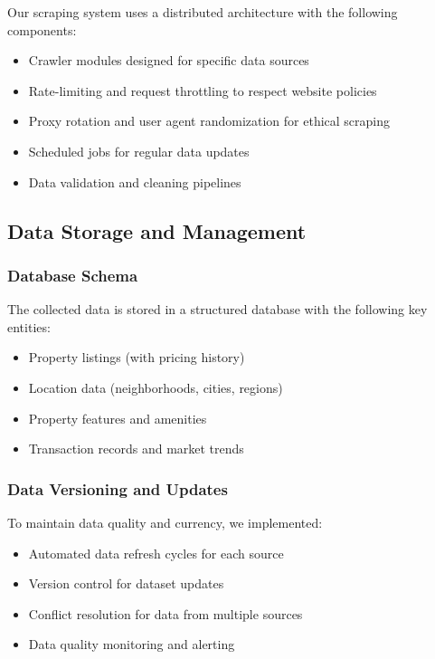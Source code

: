 Our scraping system uses a distributed architecture with the following components:
\begin{itemize}
    \item Crawler modules designed for specific data sources
    \item Rate-limiting and request throttling to respect website policies
    \item Proxy rotation and user agent randomization for ethical scraping
    \item Scheduled jobs for regular data updates
    \item Data validation and cleaning pipelines
\end{itemize}

\subsection{Data Storage and Management}
\subsubsection{Database Schema}
The collected data is stored in a structured database with the following key entities:
\begin{itemize}
    \item Property listings (with pricing history)
    \item Location data (neighborhoods, cities, regions)
    \item Property features and amenities
    \item Transaction records and market trends
\end{itemize}

\subsubsection{Data Versioning and Updates}
To maintain data quality and currency, we implemented:
\begin{itemize}
    \item Automated data refresh cycles for each source
    \item Version control for dataset updates
    \item Conflict resolution for data from multiple sources
    \item Data quality monitoring and alerting
\end{itemize}

